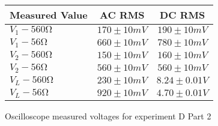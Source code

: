 \begin{figure}[H]    \centering    \begin{tabular}{|l|c|c|}
        \hline
        Measured Value & AC RMS & DC RMS \\
        \hline
        $V_{1} - 560\unit{\ohm}$ & $170\pm 10\unit{mV}$ & $190\pm 10\unit{mV}$ \\
        $V_{1} - 56\unit{\ohm}$ & $660\pm 10\unit{mV}$ & $780\pm 10\unit{mV}$ \\
        $V_{2} - 560\unit{\ohm}$ & $150\pm 10\unit{mV}$ & $160\pm 10\unit{mV}$ \\
        $V_{2} - 56\unit{\ohm}$ & $560\pm 10\unit{mV}$ & $560\pm 10\unit{mV}$ \\
        $V_{L} - 560\unit{\ohm}$ & $230\pm 10\unit{mV}$ & $8.24\pm 0.01\unit{V}$ \\
        $V_{L} - 56\unit{\ohm}$ & $920\pm 10\unit{mV}$ & $4.70\pm 0.01\unit{V}$ \\
        \hline
    \end{tabular}    \caption{Oscilloscope measured voltages for experiment D Part 2}\end{figure}